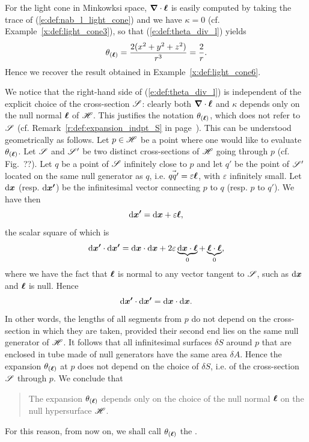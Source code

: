 {\begin{example}  \label{x:def:light_cone7}
For the light cone in Minkowksi space, $\bm{\nabla}\cdot\bm{\ell}$ is easily computed by taking the trace of
(\ref{e:def:nab_l_light_cone}) and we have $\kappa=0$ (cf. Example~\ref{x:def:light_cone3}),
so that (\ref{e:def:theta_div_l}) yields
\[
    \theta_{(\bm{\ell})} = \frac{2(x^2+y^2+z^2)}{r^3} = \frac{2}{r} .
\]
Hence we recover the result obtained in Example~\ref{x:def:light_cone6}.
\end{example}

We notice that the right-hand side of (\ref{e:def:theta_div_l}) is independent of the
explicit choice of the cross-section $\mathscr{S}$: clearly both $\bm{\nabla}\cdot\bm{\ell}$
and $\kappa$ depends only on the null normal $\bm{\ell}$ of $\mathscr{H}$. This justifies
the notation $\theta_{(\bm{\ell})}$, which does not refer to $\mathscr{S}$
(cf. Remark~\ref{r:def:expansion_indpt_S} in page~\pageref{r:def:expansion_indpt_S}).
This can be understood geometrically as follows. Let $p\in\mathscr{H}$ be a
point where one would like to evaluate $\theta_{(\bm{\ell})}$. Let $\mathscr{S}$ and $\mathscr{S}'$
be two distinct cross-sections of $\mathscr{H}$ going through $p$
(cf. Fig.~??). Let $q$ be a point of $\mathscr{S}$ infinitely close to $p$ and let $q'$
be the point of $\mathscr{S}'$ located on the same null generator as $q$,
i.e. $\vec{qq'} = \varepsilon \bm{\ell}$, with $\varepsilon$ infinitely small.
Let $\mathrm{d}\bm{x}$ (resp. $\mathrm{d}\bm{x'}$) be the infinitesimal vector connecting
$p$ to $q$ (resp. $p$ to $q'$). We have then
\[
\mathrm{d}\bm{x'} = \mathrm{d}\bm{x} + \varepsilon \bm{\ell} ,
\]
the scalar square of which is
\[
    \mathrm{d}\bm{x'}\cdot\mathrm{d}\bm{x'} =\mathrm{d}\bm{x}\cdot\mathrm{d}\bm{x}
            + 2 \varepsilon \underbrace{\mathrm{d}\bm{x}\cdot \bm{\ell}}_{0}
            + \underbrace{\bm{\ell}\cdot \bm{\ell}}_{0},
\]
where we have the fact that $\bm{\ell}$ is normal to any vector tangent to $\mathscr{S}$,
such as $\mathrm{d}\bm{x}$ and $\bm{\ell}$ is null. Hence
\[
    \mathrm{d}\bm{x'}\cdot\mathrm{d}\bm{x'} = \mathrm{d}\bm{x}\cdot\mathrm{d}\bm{x} .
\]
In other words, the lengths of all segments from $p$ do not depend
on the cross-section in which they are taken, provided their second end
lies on the same null generator of $\mathscr{H}$. It follows that all infinitesimal surfaces
$\delta S$ around $p$ that are enclosed in tube made of null generators have the same
area $\delta A$. Hence the expansion $\theta_{(\bm{\ell})}$ at $p$
does not depend on the choice of $\delta S$, i.e. of the cross-section
$\mathscr{S}$ through $p$.
We conclude that
\begin{quote}
The expansion $\theta_{(\bm{\ell})}$ depends only on the choice of the null
normal $\bm{\ell}$ on the null hypersurface $\mathscr{H}$.
\end{quote}
For this reason, from now on, we shall call $\theta_{(\bm{\ell})}$
the .

}
